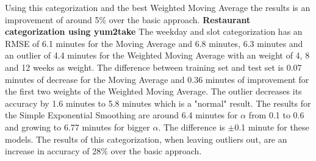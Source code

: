 Using this categorization and the best Weighted Moving Average the results is an improvement of around 5\% over the basic approach.
\newline\newline\textbf{Restaurant categorization using yum2take}\newline
The weekday and slot categorization has an RMSE of 6.1 minutes for the Moving Average and 6.8 minutes, 6.3 minutes and an outlier of 4.4 minutes for the Weighted Moving Average with an weight of 4, 8 and 12 weeks as weight. The difference between training set and test set is 0.07 minutes of decrease for the Moving Average and 0.36 minutes of improvement for the first two weights of the Weighted Moving Average. The outlier decreases its accuracy by 1.6 minutes to 5.8 minutes which is a "normal" result. The results for the Simple Exponential Smoothing are around 6.4 minutes for $\alpha$ from 0.1 to 0.6 and growing to 6.77 minutes for bigger $\alpha$. The difference is $\pm$0.1 minute for these models.\newline
The results of this categorization, when leaving outliers out, are an increase in accuracy of 28\% over the basic approach.
